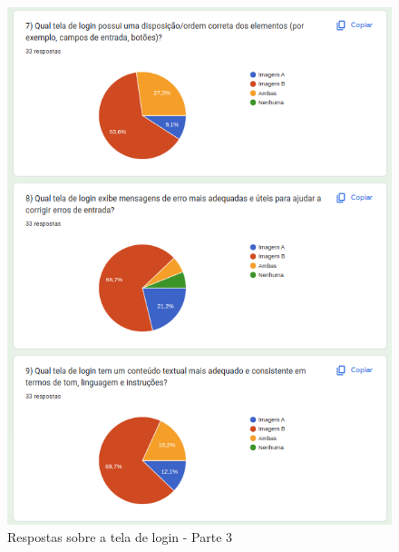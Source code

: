 \begin{figure}[!h]
	\begin{center}
	    \includegraphics[scale=0.7]{figs/Answers/Students/06.png}
	\end{center}
	\caption{\label{APB_TL03}Respostas sobre a tela de login - Parte 3}
\end{figure}

\newpage

